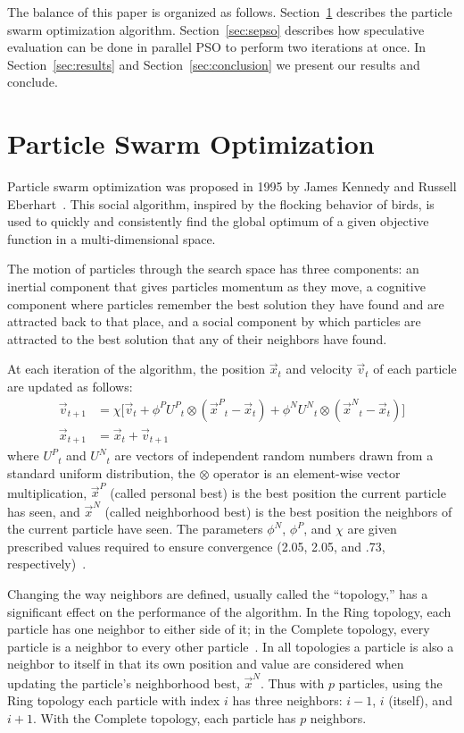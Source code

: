 \documentclass{llncs}
\renewcommand{\sec}[1]{Section~\ref{sec:#1}}
\providecommand{\pers}{\ensuremath{P}}
\providecommand{\neigh}{\ensuremath{N}}
\providecommand{\nURand}{\ensuremath{U^\neigh}}
\providecommand{\pURand}{\ensuremath{U^\pers}}
\providecommand{\ppos}{\ensuremath{\Vec{x}}}
\providecommand{\pvel}{\ensuremath{\Vec{v}}}
\providecommand{\nbest}{\ensuremath{\Vec{x}^\neigh}}
\providecommand{\pbest}{\ensuremath{\Vec{x}^\pers}}
\providecommand{\constriction}{\ensuremath{\chi}}
\providecommand{\ncoeff}{\ensuremath{\phi^\neigh}}
\providecommand{\pcoeff}{\ensuremath{\phi^\pers}}
\begin{document}
The balance of this paper is organized as follows. \sec{pso} describes the
particle swarm optimization algorithm.  \sec{sepso} describes how speculative
evaluation can be done in parallel PSO to perform two iterations at once.  In
\sec{results} and \sec{conclusion} we present our results and conclude.

\section{Particle Swarm Optimization}
\label{sec:pso}

Particle swarm optimization was proposed in 1995 by James Kennedy and Russell
Eberhart~\cite{kennedy-1995-particle-swarm-optimization}.  This social
algorithm, inspired by the flocking behavior of birds, is used to quickly and
consistently find the global optimum of a given objective function in a
multi-dimensional space.

The motion of particles through the search space has three components: an
inertial component that gives particles momentum as they move, a cognitive
component where particles remember the best solution they have found and are
attracted back to that place, and a social component by which particles are
attracted to the best solution that any of their neighbors have found.

At each iteration of the algorithm, the position $\ppos_t$ and velocity
$\pvel_t$ of each particle are updated as follows:
\begin{align}
\label{eq:velupdate}
	\pvel_{t+1} &=
		\constriction \bigl[ \pvel_t
			+ \pcoeff\pURand_{t}\otimes(\pbest_{t} - \ppos_{t})
			+ \ncoeff\nURand_{t}\otimes(\nbest_{t} - \ppos_{t})
		\bigr] \\
\label{eq:posupdate}
	\ppos_{t+1} &= \ppos_{t} + \pvel_{t+1}
\end{align}
where \( \pURand_{t} \) and \( \nURand_{t} \) are vectors of independent random
numbers drawn from a standard uniform distribution, the \( \otimes \) operator
is an element-wise vector multiplication, $\pbest$ (called personal best) is
the best position the current particle has seen, and $\nbest$ (called
neighborhood best) is the best position the neighbors of the current particle
have seen.  The parameters \( \ncoeff \), \( \pcoeff \), and \( \constriction
\) are given prescribed values required to ensure convergence (2.05, 2.05, and
.73, respectively)~\cite{clerc-2002-constricted-pso}. 

Changing the way neighbors are defined, usually called the ``topology,'' has a
significant effect on the performance of the algorithm.  In the Ring topology,
each particle has one neighbor to either side of it; in the Complete topology,
every particle is a neighbor to every other
particle~\cite{bratton-2007-defining-a-standard-for-pso}.  In all topologies a
particle is also a neighbor to itself in that its own position and value are
considered when updating the particle's neighborhood best, $\nbest$.  Thus with
$p$ particles, using the Ring topology each particle with index $i$ has three
neighbors: $i-1$, $i$ (itself), and $i+1$.  With the Complete topology, each
particle has $p$ neighbors.
\end{document}
